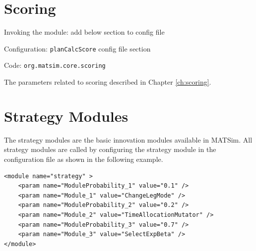 

\section{Scoring}
\label{sec:scoring}
\begin{compactitem}
\item Invoking the module: add below section to config file
\item Configuration: \lstinline|planCalcScore| config file section
\item Code: \lstinline|org.matsim.core.scoring|
\end{compactitem}

The parameters related to scoring described in Chapter \ref{ch:scoring}.



\section{Strategy Modules}
\label{sec:strategymodules}


The strategy modules are the basic innovation modules available in MATSim. All strategy modules are called by configuring the strategy module in the configuration file as shown in the following example.

\begin{lstlisting}
<module name="strategy" >
    <param name="ModuleProbability_1" value="0.1" />
    <param name="Module_1" value="ChangeLegMode" />
    <param name="ModuleProbability_2" value="0.2" />
    <param name="Module_2" value="TimeAllocationMutator" />
    <param name="ModuleProbability_3" value="0.7" />
    <param name="Module_3" value="SelectExpBeta" />
</module>
\end{lstlisting}

